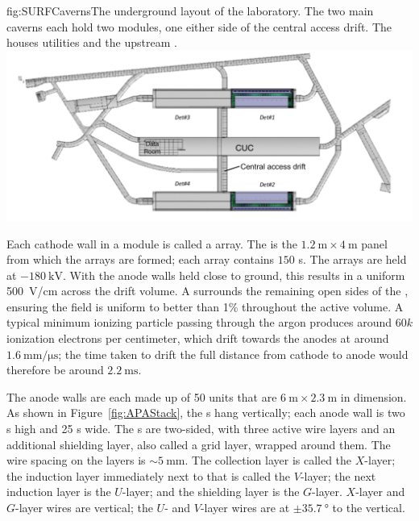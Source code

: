 \begin{dunefigure}{fig:SURFCaverns}{The underground layout of the  laboratory. The two main caverns each hold two \nominalmodsize modules, one either side of the central access drift. The  houses utilities and the upstream .}
\includegraphics[width=\textwidth]{graphics/UndergroundLayout2.pdf}
\end{dunefigure}

Each cathode wall in a module is called a  array. The  is the $\SI{1.2}{\meter}\times\SI{4}{\meter}$ panel from which the  arrays are formed; each  array contains $150$ s. The  arrays are held at $-\SI{180}{\kilo\volt}$. With the anode walls held close to ground, this results in a uniform \SI{500}{\volt/\centi\meter} \efield across the drift volume. A  surrounds the remaining open sides of the , ensuring the field is uniform to better than 1\% throughout the active volume. A typical minimum ionizing particle passing through the argon produces around $60k$ ionization electrons per centimeter, which drift towards the anodes at around $\SI{1.6}{\mm/\micro\second}$; the time taken to drift the full distance from cathode to anode would therefore be around $\SI{2.2}{\milli\second}$.

The anode walls are each made up of 50  units that are $\SI{6}{\meter}\times\SI{2.3}{\meter}$ in dimension. As shown in Figure~\ref{fig:APAStack}, the s hang vertically; each anode wall is two s high and 25 s wide. The s are two-sided, with three active wire layers and an additional shielding layer, also called a grid layer, wrapped around them. The wire spacing on the layers is $\sim\!\SI{5}{\mm}$. The collection layer is called the $X$-layer; the induction layer immediately next to that is called the $V$-layer; the next induction layer is the $U$-layer; and the shielding layer is the $G$-layer. $X$-layer and $G$-layer wires are vertical; the $U$- and $V$-layer wires are at $\pm\SI{35.7}{\degree}$ to the vertical.


